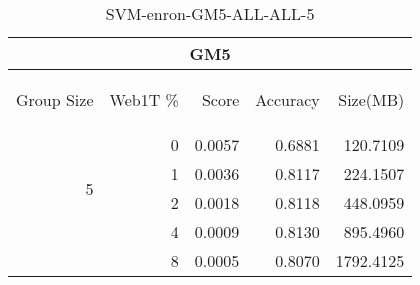 \begin{center}
\begin{table}[htbp] 
 \begin{center}
\begin{tabular}{ | r | r | r | r | r |}
\hline
\multicolumn{5}{|c|}{GM5}\\
\hline
\begin{sideways}Group Size\end{sideways} & \begin{sideways}Web1T \%\end{sideways} & \begin{sideways}Score\end{sideways} & \begin{sideways}Accuracy\end{sideways} & \begin{sideways}Size(MB)\end{sideways}\\
\hline
\multirow{4}{*}{5}
 & 0 & 0.0057 & 0.6881 & 120.7109\\ \cline{2-5}
 & 1 & 0.0036 & 0.8117 & 224.1507\\ \cline{2-5}
 & 2 & 0.0018 & 0.8118 & 448.0959\\ \cline{2-5}
 & 4 & 0.0009 & 0.8130 & 895.4960\\ \cline{2-5}
 & 8 & 0.0005 & 0.8070 & 1792.4125\\ \cline{2-5}
\hline
\end{tabular}
\caption{SVM-enron-GM5-ALL-ALL-5}
\label{table:SVM-enron-GM5-ALL-ALL-5}
\end{center}
 \end{table}
\end{center}

